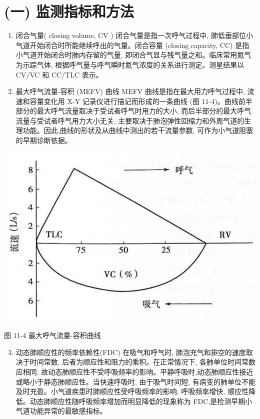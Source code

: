 \documentclass[10pt]{article}
\begin{document}
\section*{(一) 监测指标和方法}
\begin{enumerate}
  \item 闭合气量( closing volume, $\mathrm{CV}$ ) 闭合气量是指一次呼气过程中, 肺低垂部位小气道开始闭合时所能继续呼出的气量。闭合容量 (closing capacity, CC) 是指小气道开始闭合时肺内存留的气量, 即闭合气显与残气量之和。临床常用氮气为示踪气体, 根据呼气量与呼气瞬时氮气浓度的关系进行测定。测星结果以 CV/VC 和 CC/TLC 表示。

  \item 最大呼气流量-容积 (MEFV) 曲线 MEFV 曲线是指在最大用力呼气过程中, 流速和容量变化用 X-Y 记录仪进行描记而形成的一条曲线 (图 11-4)。曲线前半部分的最大呼气流量取决于受试者呼气时用力的大小, 而后半部分的最大呼气流量与受试者呼气用力大小无关, 主要取决于肺泡弹性回缩力和外周气道的生理功能。因此,曲线的形状及从曲线中测出的若干流量参数, 可作为小气道阻塞的早期诊断依据。

\end{enumerate}

\begin{center}
\includegraphics[max width=\textwidth]{2024_07_09_002a177993bd97d1d6d7g-122}
\end{center}

图 11-4 最大呼气流量-容积曲线

\begin{enumerate}
  \setcounter{enumi}{2}
  \item 动态肺顺应性的频率依赖性(FDC) 在吸气和呼气时, 肺泡充气和排空的速度取决于时间常数, 后者为顺应性和阻力的乘积。在正常情况下, 各肺单位时间常数应相同, 故动态肺顺应性不受呼吸频率的影响。平静呼吸时,动态肺顺应性接近或略小于静态肺顺应性。当快速呼吸时, 由于吸气时间短, 有病变的肺单位不能及时充盈。小气道疾患时肺顺应性受呼吸频率的影响, 呼吸频率增快, 顺应性降低。动态肺顺应性随呼吸频率增加而明显降低的现象称为 FDC,是检测早期小气道功能异常的最敏感指标。
\end{enumerate}
\end{document}
